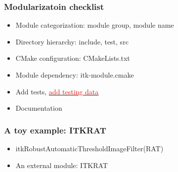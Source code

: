 \begin{frame}
\frametitle{Modularizatoin checklist}
\begin{itemize}
\item  Module categorization: module group, module name
\pause
\item  Directory hierarchy: include, test, src
\pause
\item  CMake configuration: CMakeLists.txt
\pause
\item  Module dependency: itk-module.cmake
\pause
\item  Add tests, \href{http://www.vtk.org/Wiki/ITK/Git/Develop/Data\#Workflow}{\textcolor{red}{add testing data}}
\pause
\item  Documentation
\end{itemize}
\end{frame}


\begin{frame}
\frametitle{A toy example: ITKRAT}
\begin{itemize}
\item  itkRobustAutomaticThresholdImageFilter(RAT)
\pause
\item  An external module: ITKRAT
\end{itemize}
\end{frame}

